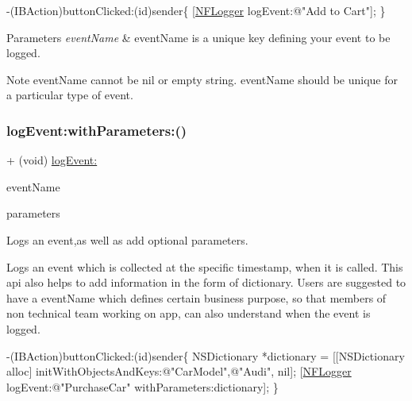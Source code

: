 \begin{DoxyCode}
-(IBAction)buttonClicked:(\textcolor{keywordtype}{id})sender\{
 [\hyperlink{interface_n_f_logger}{NFLogger} logEvent:\textcolor{stringliteral}{@"Add to Cart"}];
\}
\end{DoxyCode}
 
\begin{DoxyParams}{Parameters}
{\em event\+Name} & event\+Name is a unique key defining your event to be logged. \\
\hline
\end{DoxyParams}
\begin{DoxyNote}{Note}
event\+Name cannot be nil or empty string. event\+Name should be unique for a particular type of event. 
\end{DoxyNote}
\mbox{\label{interface_n_f_logger_a0135c2e9b6e8d0241bbbb3383a2ed310}} 
\subsubsection{\texorpdfstring{log\+Event\+:with\+Parameters\+:()}{logEvent:withParameters:()}}
{\footnotesize\ttfamily + (void) \hyperlink{interface_n_f_logger_a932bba0925a8ffefec035de7f3cff73a}{log\+Event\+:} \begin{DoxyParamCaption}\item[{(N\+S\+String $\ast$)}]{event\+Name }\item[{withParameters:(N\+S\+Dictionary $\ast$)}]{parameters }\end{DoxyParamCaption}}



Logs an event,as well as add optional parameters. 

Logs an event which is collected at the specific timestamp, when it is called. This api also helps to add information in the form of dictionary. Users are suggested to have a event\+Name which defines certain business purpose, so that members of non technical team working on app, can also understand when the event is logged.


\begin{DoxyCode}
-(IBAction)buttonClicked:(\textcolor{keywordtype}{id})sender\{
 NSDictionary *dictionary = [[NSDictionary alloc] initWithObjectsAndKeys:\textcolor{stringliteral}{@"CarModel"},\textcolor{stringliteral}{@"Audi"}, nil];
 [\hyperlink{interface_n_f_logger}{NFLogger} logEvent:\textcolor{stringliteral}{@"PurchaseCar"} withParameters:dictionary];
\}
\end{DoxyCode}
 
